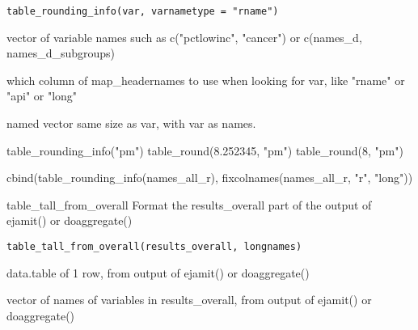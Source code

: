 \documentclass[a4paper]{book}
\begin{document}
%
\begin{Usage}
\begin{verbatim}
table_rounding_info(var, varnametype = "rname")
\end{verbatim}
\end{Usage}
%
\begin{Arguments}
\begin{ldescription}
\item[\code{var}] vector of variable names such as c("pctlowinc", "cancer") or c(names\_d, names\_d\_subgroups)

\item[\code{varnametype}] which column of map\_headernames to use when looking for var, like "rname" or "api" or "long"
\end{ldescription}
\end{Arguments}
%
\begin{Value}
named vector same size as var, with var as names.
\end{Value}
%
\begin{SeeAlso}\relax
{} 
\end{SeeAlso}
%
\begin{Examples}
\begin{ExampleCode}
  table_rounding_info("pm")
  table_round(8.252345, "pm")
  table_round(8, "pm")
  
  cbind(table_rounding_info(names_all_r), fixcolnames(names_all_r, "r", "long"))
 
\end{ExampleCode}
\end{Examples}
%
\begin{Description}\relax
table\_tall\_from\_overall
Format the results\_overall part of the output of ejamit() or doaggregate()
\end{Description}
%
\begin{Usage}
\begin{verbatim}
table_tall_from_overall(results_overall, longnames)
\end{verbatim}
\end{Usage}
%
\begin{Arguments}
\begin{ldescription}
\item[\code{results\_overall}] data.table of 1 row, from output of ejamit() or doaggregate()

\item[\code{longnames}] vector of names of variables in results\_overall,
from output of ejamit() or doaggregate()
\end{ldescription}
\end{Arguments}
\end{document}
